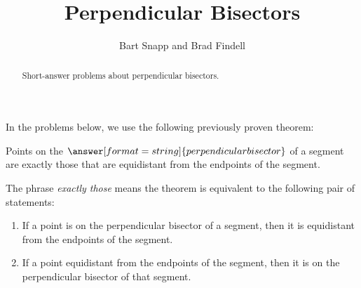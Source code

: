 \documentclass[nooutcomes]{ximera}
\title{Perpendicular Bisectors}
\author{Bart Snapp and Brad Findell}
\begin{document}
\begin{abstract}
Short-answer problems about perpendicular bisectors. 
\end{abstract}
\maketitle


\begin{problem}
In the problems below, we use the following previously proven theorem: 
\begin{theorem}
Points on the $\answer[format=string]{perpendicular bisector}$ of a segment are exactly those 
that are equidistant from the endpoints of the segment.  
\end{theorem}
The phrase \emph{exactly those} means the theorem is equivalent to the following pair of statements: 
\begin{enumerate}
\item If a point is on the perpendicular bisector of a segment, then it is equidistant from the endpoints of the segment. 
\item If a point equidistant from the endpoints of the segment, then it is on the perpendicular bisector of that segment. 
\end{enumerate}
\end{problem}
\end{document}
